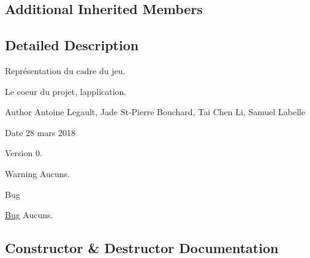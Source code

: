 \subsection*{Additional Inherited Members}


\subsection{Detailed Description}
Représentation du cadre du jeu. 

Le coeur du projet, l\textquotesingle{}application. \begin{DoxyAuthor}{Author}
Antoine Legault, Jade St-\/\+Pierre Bouchard, Tai Chen Li, Samuel Labelle 
\end{DoxyAuthor}
\begin{DoxyDate}{Date}
28 mars 2018 
\end{DoxyDate}
\begin{DoxyVersion}{Version}
0. 
\end{DoxyVersion}
\begin{DoxyWarning}{Warning}
Aucuns. 
\end{DoxyWarning}
\begin{DoxyRefDesc}{Bug}
\item[\hyperlink{bug__bug000014}{Bug}]Aucuns. \end{DoxyRefDesc}


\subsection{Constructor \& Destructor Documentation}
\hypertarget{class_projet_final_a87682faa1a37e08de15cb2dda19871ed}{}
